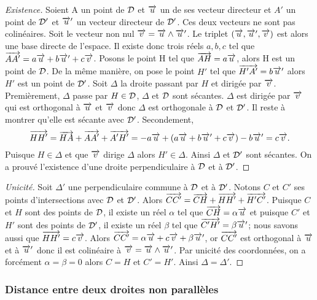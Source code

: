 \begin{proof}[Existence]
  Soient A un point de \(\mathcal{D}\) et \(\overrightarrow{u}\) un de ses vecteur directeur et 
  \(A'\) un point de \(\mathcal{D}'\) et \(\overrightarrow{u}'\) un vecteur directeur de \(\mathcal{D}'\).  
  Ces deux vecteurs ne sont pas colinéaires. Soit le vecteur non nul \(\overrightarrow{v} = 
  \overrightarrow{u}\wedge\overrightarrow{u}'\). Le triplet \((\overrightarrow{u}, \overrightarrow{u}',\overrightarrow{v})\) est alors une base directe 
  de l'espace. Il existe donc trois réels \(a, b, c\) tel que \(\overrightarrow{AA'} = 
  a\overrightarrow{u} + b\overrightarrow{u}'+c\overrightarrow{v}\). Posons le point H tel que \(\overrightarrow{AH} = a\overrightarrow{u}\), alors H 
  est un point de \(\mathcal{D}\). De la même manière, on pose le point \(H'\) tel que 
  \(\overrightarrow{H'A'} = b\overrightarrow{u}'\) alors \(H'\) est un point de \(\mathcal{D}'\). Soit 
  \(\Delta\) la droite passant par \(H\) et dirigée par \(\overrightarrow{v}\).  
  Premièrement, \(\Delta\) passe par \(H\in\mathcal{D}\), \(\Delta\) et \(\mathcal{D}\) sont 
  sécantes. \(\Delta\) est dirigée par \(\overrightarrow{v}\) qui est orthogonal à \(\overrightarrow{u}\) et 
  \(\overrightarrow{v}\) donc \(\Delta\) est orthogonale à \(\mathcal{D}\) et \(\mathcal{D}'\).  Il reste à 
  montrer qu'elle est sécante avec \(\mathcal{D}'\). Secondement,
  \begin{equation}
    \overrightarrow{HH'} = \overrightarrow{HA} + \overrightarrow{AA'} + \overrightarrow{A'H'} = -a\overrightarrow{u} + (a\overrightarrow{u} + b\overrightarrow{u}' 
    + c\overrightarrow{v}) - b\overrightarrow{u}' = c\overrightarrow{v}.
  \end{equation}
  Puisque \(H\in\Delta\) et que \(\overrightarrow{v}\) dirige \(\Delta\) alors 
  \(H'\in\Delta\). Ainsi \(\Delta\) et \(\mathcal{D}'\) sont sécantes. On a prouvé 
  l'existence d'une droite perpendiculaire à \(\mathcal{D}\) et à \(\mathcal{D}'\).
\end{proof}

\begin{proof}[Unicité]
  Soit \(\Delta'\) une perpendiculaire commune à \(\mathcal{D}\) et à \(\mathcal{D}'\).  
  Notons \(C\) et \(C'\) ses points d'intersections avec \(\mathcal{D}\) et \(\mathcal{D}'\). 
  Alors \(\overrightarrow{CC'} = \overrightarrow{CH} + \overrightarrow{HH'} + \overrightarrow{H'C'}\).  Puisque \(C\) 
  et \(H\) sont des points de \(\mathcal{D}\), il existe un réel \(\alpha\) tel que 
  \(\overrightarrow{CH} = \alpha\overrightarrow{u}\) et puisque \(C'\) et \(H'\) sont des points de 
  \(\mathcal{D}'\), il existe un réel \(\beta\) tel que \(\overrightarrow{C'H'} = \beta\overrightarrow{u}'\); 
  nous savons aussi que \(\overrightarrow{HH'} = c\overrightarrow{v}\).  Alors \(\overrightarrow{CC'} = \alpha\overrightarrow{u} 
  + c\overrightarrow{v} + \beta\overrightarrow{u}'\), or \(\overrightarrow{CC'}\) est orthogonal à \(\overrightarrow{u}\) et à 
  \(\overrightarrow{u}'\) donc il est colinéaire à \(\overrightarrow{v} = \overrightarrow{u}\wedge\overrightarrow{u}'\). Par unicité des 
  coordonnées, on a forcément \(\alpha = \beta = 0\) alors \(C = H\) et \(C' = 
  H'\). Ainsi \(\Delta = \Delta'\).
\end{proof}

\subsubsection{Distance entre deux droites non parallèles}

